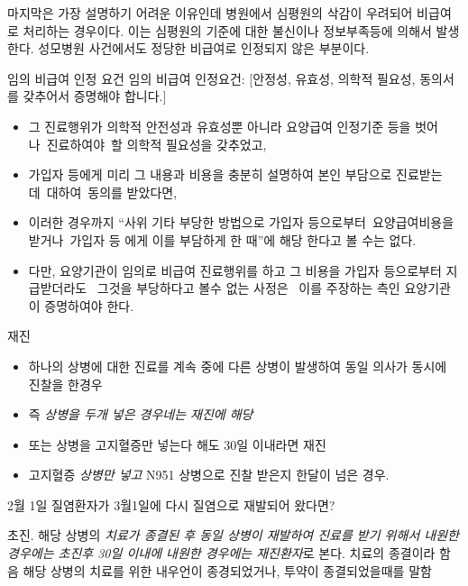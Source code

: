 마지막은 가장 설명하기 어려운 이유인데 병원에서 심평원의 삭감이 우려되어 비급여로 처리하는 경우이다. 이는 심평원의 기준에 대한 불신이나 정보부족등에 의해서 발생한다. 성모병원 사건에서도 정당한 비급여로 인정되지 않은 부분이다. 
\begin{commentbox}{임의 비급여 인정 요건}
임의 비급여 인정요건: [안정성, 유효성, 의학적 필요성, 동의서를 갖추어서 증명해야 합니다.]

\begin{itemize}\tightlist
\item 그 진료행위가 의학적 안전성과 유효성뿐 아니라 요양급여 인정기준 등을 벗어나 진료하여야 할 의학적 필요성을 갖추었고,
\item 가입자 등에게 미리 그 내용과 비용을 충분히 설명하여 본인 부담으로 진료받는 데 대하여 동의를 받았다면, 
\item 이러한 경우까지 “사위 기타 부당한 방법으로 가입자 등으로부터 요양급여비용을 받거나 가입자 등 에게 이를 부담하게 한 때”에 해당 한다고 볼 수는 없다.
\item 다만, 요양기관이 임의로 비급여 진료행위를 하고 그 비용을 가입자 등으로부터 지급받더라도  그것을 부당하다고 볼수 없는 사정은  이를 주장하는 측인 요양기관이 증명하여야 한다.
\end{itemize}
\end{commentbox}

\begin{commentbox}{재진}
\begin{itemize}\tightlist
\item 하나의 상병에 대한 진료를 계속 중에 다른 상병이 발생하여 동일 의사가 동시에 진찰을 한경우
\item 즉 \emph{상병을 두개 넣은 경우네는 재진에 해당}
\item 또는 상병을 고지혈증만 넣는다 해도 30일 이내라면 재진
\end{itemize}
\begin{itemize}\tightlist
\item 고지혈증 \emph{상병만 넣고} N951 상병으로 진찰 받은지 한달이 넘은 경우.
\end{itemize}
\end{commentbox}

2월 1일 질염환자가 3월1일에 다시 질염으로 재발되어 왔다면? 
\begin{quotebox}
초진. 해당 상병의 \emph{치료가 종결된 후 동일 상병이 재발하여 진료를 받기 위해서 내원한 경우에는 초진후 30일 이내에 내원한 경우에는 재진환자}로 본다. 치료의 종결이라 함음 해당 상병의 치료를 위한 내우언이 종경되었거나, 투약이 종결되었을때를 말함
\end{quotebox}

